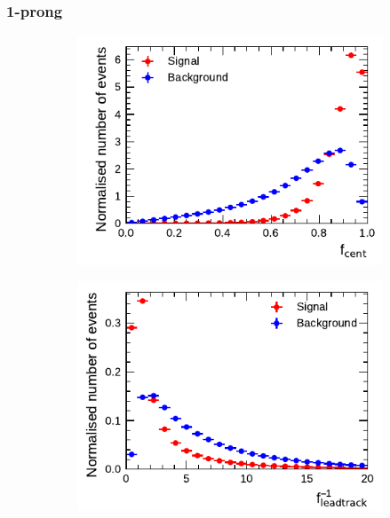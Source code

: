 \subsubsection{1-prong}
\begin{figure}[htbp]
  \begin{subfigure}{0.5\textwidth}
    \centering
    \includegraphics{./figures/baseline_bdt_vars/1p/centFrac.pdf}
  \end{subfigure}%
  \begin{subfigure}{0.5\textwidth}
    \centering
    \includegraphics{./figures/baseline_bdt_vars/1p/etOverPtLeadTrk.pdf}
  \end{subfigure}
  \begin{subfigure}{0.5\textwidth}
    \centering

\end{subfigure}
\end{figure}
